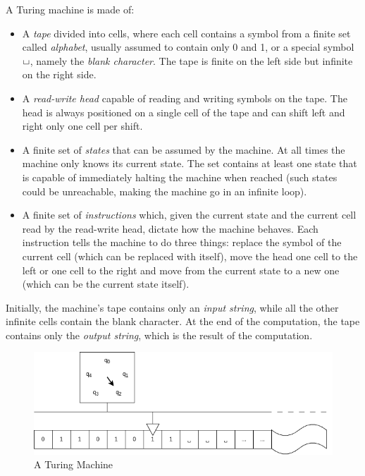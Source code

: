 A Turing machine is made of:
\begin{itemize}
    \item A \textit{tape} divided into cells, where each cell contains a symbol from a finite set called \textit{alphabet}, usually assumed to contain only 0 and 1, or a special symbol $\blankchar$, namely the \textit{blank character}. The tape is finite on the left side but infinite on the right side. 
    \item A \textit{read-write head} capable of reading and writing symbols on the tape. The head is always positioned on a single cell of the tape and can shift left and right only one cell per shift.
    \item A finite set of \textit{states} that can be assumed by the machine. At all times the machine only knows its current state. The set contains at least one state that is capable of immediately halting the machine when reached (such states could be unreachable, making the machine go in an infinite loop).
    \item A finite set of \textit{instructions} which, given the current state and the current cell read by the read-write head, dictate how the machine behaves. Each instruction tells the machine to do three things: replace the symbol of the current cell (which can be replaced with itself), move the head one cell to the left or one cell to the right and move from the current state to a new one (which can be the current state itself).
\end{itemize}

Initially, the machine's tape contains only an \textit{input string}, while all the other infinite cells contain the blank character. At the end of the computation, the tape contains only the \textit{output string}, which is the result of the computation.

\begin{figure}[H]
    \centering
    \includegraphics[scale=0.5]{resources/images/tm.png}

    \caption{A Turing Machine}
\end{figure}

